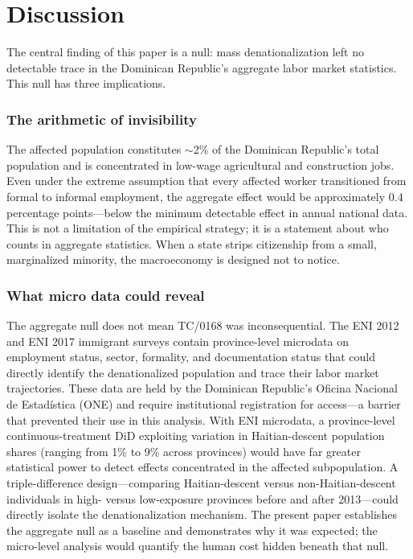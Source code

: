 \documentclass[12pt]{article}
\begin{document}
\section{Discussion}

The central finding of this paper is a null: mass denationalization left no detectable trace in the Dominican Republic's aggregate labor market statistics. This null has three implications.

\subsubsection*{The arithmetic of invisibility}
The affected population constitutes $\sim$2\% of the Dominican Republic's total population and is concentrated in low-wage agricultural and construction jobs. Even under the extreme assumption that every affected worker transitioned from formal to informal employment, the aggregate effect would be approximately 0.4 percentage points---below the minimum detectable effect in annual national data. This is not a limitation of the empirical strategy; it is a statement about who counts in aggregate statistics. When a state strips citizenship from a small, marginalized minority, the macroeconomy is designed not to notice.

\subsubsection*{What micro data could reveal}
The aggregate null does not mean TC/0168 was inconsequential. The ENI 2012 and ENI 2017 immigrant surveys contain province-level microdata on employment status, sector, formality, and documentation status that could directly identify the denationalized population and trace their labor market trajectories. These data are held by the Dominican Republic's Oficina Nacional de Estad\'{i}stica (ONE) and require institutional registration for access---a barrier that prevented their use in this analysis. With ENI microdata, a province-level continuous-treatment DiD exploiting variation in Haitian-descent population shares (ranging from 1\% to 9\% across provinces) would have far greater statistical power to detect effects concentrated in the affected subpopulation. A triple-difference design---comparing Haitian-descent versus non-Haitian-descent individuals in high- versus low-exposure provinces before and after 2013---could directly isolate the denationalization mechanism. The present paper establishes the aggregate null as a baseline and demonstrates why it was expected; the micro-level analysis would quantify the human cost hidden beneath that null.
\end{document}
